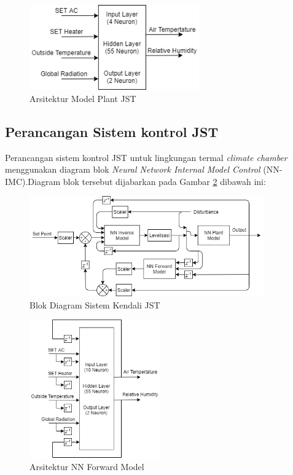 \begin{figure}[!h]
	\centering
	\includegraphics[width=0.65\textwidth]{figures/NNPlantModelDesign}
	\caption{Arsitektur Model Plant JST}
	\label{fig:4:NNPlantModelDesign}
\end{figure}

\subsection{Perancangan Sistem kontrol JST}
Perancangan sistem kontrol JST untuk lingkungan termal \textit{climate chamber} menggunakan diagram blok \textit{Neural Network Internal Model Control} (NN-IMC).Diagram blok tersebut dijabarkan pada Gambar \ref{fig:4:ConstrolSystemBlockDiagram} dibawah ini:

\begin{figure}[!h]
	\centering
	\includegraphics[width=0.9\textwidth]{figures/ControlDesignDiagram}
	\caption{Blok Diagram Sistem Kendali JST}
	\label{fig:4:ConstrolSystemBlockDiagram}
\end{figure}

\begin{figure}[!b]
	\centering
	\includegraphics[width=0.5\textwidth]{figures/NNForwardModelDesign}
	\caption{Arsitektur NN Forward Model}
	\label{fig:4:NNForwardModelDesign}
\end{figure}

